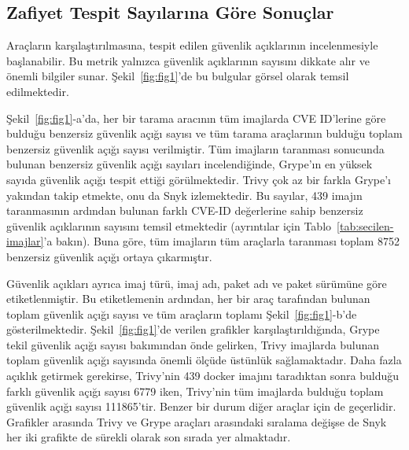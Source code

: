 \subsection{Zafiyet Tespit Sayılarına Göre Sonuçlar}\label{subsec:ResultsByDetectionCounts}

Araçların karşılaştırılmasına, tespit edilen güvenlik açıklarının incelenmesiyle başlanabilir. Bu metrik yalnızca güvenlik açıklarının sayısını dikkate alır ve önemli bilgiler sunar. Şekil~\ref{fig:fig1}'de bu bulgular görsel olarak temsil edilmektedir.

Şekil~\ref{fig:fig1}-a'da, her bir tarama aracının tüm imajlarda CVE ID'lerine göre bulduğu benzersiz güvenlik açığı sayısı ve tüm tarama araçlarının bulduğu toplam benzersiz güvenlik açığı sayısı verilmiştir. Tüm imajların taranması sonucunda bulunan benzersiz güvenlik açığı sayıları incelendiğinde, Grype'ın en yüksek sayıda güvenlik açığı tespit ettiği görülmektedir. Trivy çok az bir farkla Grype'ı yakından takip etmekte, onu da Snyk izlemektedir. Bu sayılar, 439 imajın taranmasının ardından bulunan farklı CVE-ID değerlerine sahip benzersiz güvenlik açıklarının sayısını temsil etmektedir (ayrıntılar için Tablo~\ref{tab:secilen-imajlar}'a bakın). Buna göre, tüm imajların tüm araçlarla taranması toplam 8752 benzersiz güvenlik açığı ortaya çıkarmıştır.

Güvenlik açıkları ayrıca imaj türü, imaj adı, paket adı ve paket sürümüne göre etiketlenmiştir. Bu etiketlemenin ardından, her bir araç tarafından bulunan toplam güvenlik açığı sayısı ve tüm araçların toplamı Şekil~\ref{fig:fig1}-b'de gösterilmektedir. Şekil~\ref{fig:fig1}'de verilen grafikler karşılaştırıldığında, Grype tekil güvenlik açığı sayısı bakımından önde gelirken, Trivy imajlarda bulunan toplam güvenlik açığı sayısında önemli ölçüde üstünlük sağlamaktadır. Daha fazla açıklık getirmek gerekirse, Trivy'nin 439 docker imajını taradıktan sonra bulduğu farklı güvenlik açığı sayısı 6779 iken, Trivy'nin tüm imajlarda bulduğu toplam güvenlik açığı sayısı 111865'tir. Benzer bir durum diğer araçlar için de geçerlidir. Grafikler arasında Trivy ve Grype araçları arasındaki sıralama değişse de Snyk her iki grafikte de sürekli olarak son sırada yer almaktadır.

